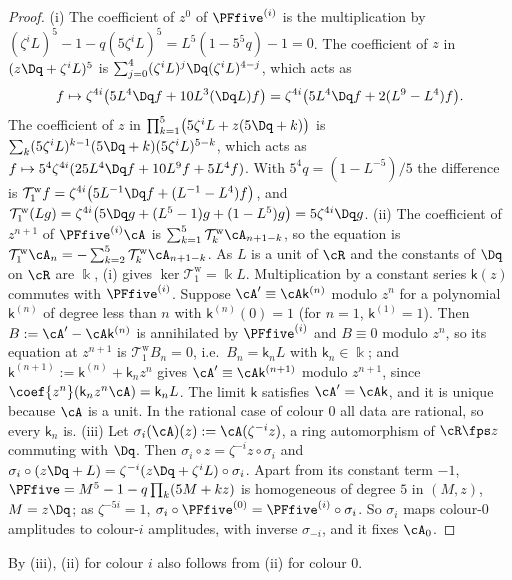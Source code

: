 \begin{proof}
(i) The coefficient of $z^0$ of $\PFfive^{(i)}$ is the multiplication by $(\zeta^iL)^5-1-q(5\zeta^iL)^5=L^5(1-5^5q)-1=0$. The coefficient of $z$ in $(z\Dq+\zeta^iL)^5$ is $\sum_{j=0}^4(\zeta^iL)^j\Dq(\zeta^iL)^{4-j}$, which acts as
\[
f\mapsto\zeta^{4i}\bigl(5L^4\Dq f+10L^3(\Dq L)f\bigr)=\zeta^{4i}\bigl(5L^4\Dq f+2(L^9-L^4)f\bigr).
\]
The coefficient of $z$ in $\prod_{k=1}^5\bigl(5\zeta^iL+z(5\Dq+k)\bigr)$ is $\sum_k(5\zeta^iL)^{k-1}(5\Dq+k)(5\zeta^iL)^{5-k}$, which acts as $f\mapsto5^4\zeta^{4i}(25L^4\Dq f+10L^9f+5L^4f)$. With $5^4q=(1-L^{-5})/5$ the difference is $\mathcal T^{\mathrm w}_1f=\zeta^{4i}\bigl(5L^{-1}\Dq f+(L^{-1}-L^4)f\bigr)$, and $\mathcal T^{\mathrm w}_1(Lg)=\zeta^{4i}\bigl(5\Dq g+(L^5-1)g+(1-L^5)g\bigr)=5\zeta^{4i}\Dq g$.
(ii) The coefficient of $z^{n+1}$ of $\PFfive^{(i)}\cA$ is $\sum_{k=1}^5\mathcal T^{\mathrm w}_k\cA_{n+1-k}$, so the equation is $\mathcal T^{\mathrm w}_1\cA_n=-\sum_{k=2}^5\mathcal T^{\mathrm w}_k\cA_{n+1-k}$. As $L$ is a unit of $\cR$ and the constants of $\Dq$ on $\cR$ are $\Bbbk$, (i) gives $\ker\mathcal T^{\mathrm w}_1=\Bbbk L$. Multiplication by a constant series $\mathsf k(z)$ commutes with $\PFfive^{(i)}$. Suppose $\cA'\equiv\cA\mathsf k^{(n)}$ modulo $z^n$ for a polynomial $\mathsf k^{(n)}$ of degree less than $n$ with $\mathsf k^{(n)}(0)=1$ (for $n=1$, $\mathsf k^{(1)}=1$). Then $B:=\cA'-\cA\mathsf k^{(n)}$ is annihilated by $\PFfive^{(i)}$ and $B\equiv0$ modulo $z^n$, so its equation at $z^{n+1}$ is $\mathcal T^{\mathrm w}_1B_n=0$, i.e.\ $B_n=\mathsf k_nL$ with $\mathsf k_n\in\Bbbk$; and $\mathsf k^{(n+1)}:=\mathsf k^{(n)}+\mathsf k_nz^n$ gives $\cA'\equiv\cA\mathsf k^{(n+1)}$ modulo $z^{n+1}$, since $\coef{z^n}(\mathsf k_nz^n\cA)=\mathsf k_nL$. The limit $\mathsf k$ satisfies $\cA'=\cA\mathsf k$, and it is unique because $\cA$ is a unit. In the rational case of colour $0$ all data are rational, so every $\mathsf k_n$ is.
(iii) Let $\sigma_i(\cA)(z):=\cA(\zeta^{-i}z)$, a ring automorphism of $\cR\fps z$ commuting with $\Dq$. Then $\sigma_i\circ z=\zeta^{-i}z\circ\sigma_i$ and $\sigma_i\circ(z\Dq+L)=\zeta^{-i}(z\Dq+\zeta^iL)\circ\sigma_i$. Apart from its constant term $-1$, $\PFfive=M^5-1-q\prod_k(5M+kz)$ is homogeneous of degree $5$ in $(M,z)$, $M=z\Dq$; as $\zeta^{-5i}=1$, $\sigma_i\circ\PFfive^{(0)}=\PFfive^{(i)}\circ\sigma_i$. So $\sigma_i$ maps colour-$0$ amplitudes to colour-$i$ amplitudes, with inverse $\sigma_{-i}$, and it fixes $\cA_0$.
\end{proof}

By (iii), (ii) for colour $i$ also follows from (ii) for colour $0$.

